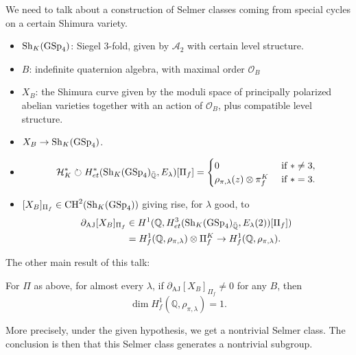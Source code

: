 \documentclass[reqno]{amsart} 
\begin{document}
We need to talk about a construction of Selmer classes coming from special cycles on a certain Shimura variety.
\begin{itemize}
\item $\operatorname{Sh}_K(\operatorname{GSp}_4)$: Siegel $3$-fold, given by $\mathcal{A}_2$ with certain level structure.
\item $B$: indefinite quaternion algebra, with maximal order $\mathcal{O}_B$
\item $X_B$: the Shimura curve given by the moduli space of principally polarized abelian varieties together with an action of $\mathcal{O}_B$, plus compatible level structure.
\item $X_B \rightarrow \operatorname{Sh}_K(\operatorname{GSp}_4)$.
\item
  \begin{equation*}
    \mathcal{H}_K^{\ast} \circlearrowright H^\ast_{et}(\operatorname{Sh}_K(\operatorname{GSp}_4)_{\bar{\mathbb{Q}}}, E_\lambda)[\Pi_f]
    =
    \begin{cases}
      0 & \text{ if } \ast \neq 3, \\
      \rho_{\pi, \lambda}(z) \otimes \pi_f^K         &  \text{ if } \ast = 3.
    \end{cases}
  \end{equation*}
\item $[X_B]_{\Pi_f} \in \operatorname{CH}^2(\operatorname{Sh}_K(\operatorname{GSp}_4))$ giving rise, for $\lambda$ good, to
  \begin{align*}
    \partial_{\mathrm{AJ}}[X_B]_{\Pi_f} &\in H^1(\mathbb{Q}, H_{et}^3(\operatorname{Sh}_K(\operatorname{GSp}_4)_{\bar{\mathbb{Q}}}, E_\lambda(2))[\Pi_f])
    \\
                                        &
                                          =
                                          H_f^1(\mathbb{Q}, \rho_{\pi , \lambda}) \otimes \Pi_f^K \rightarrow H_f^1(\mathbb{Q}, \rho_{\pi, \lambda}).
  \end{align*}
\end{itemize}

The other main result of this talk:
\begin{theorem}[S.,\ TBD]\label{theorem:cnpooluola}
  For $\Pi$ as above, for almost every $\lambda$, if $\partial_{\mathrm{AJ}}[X_B]_{\Pi_f} \neq 0$ for any $B$, then
  \begin{equation*}
    \dim H_f^1(\mathbb{Q}, \rho_{\pi, \lambda}) = 1.
  \end{equation*}  
\end{theorem}
More precisely, under the given hypothesis, we get a nontrivial Selmer class.  The conclusion is then that this Selmer class generates a nontrivial subgroup.
\end{document}
